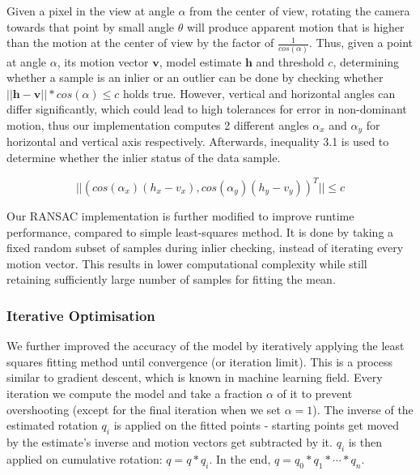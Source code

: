 \documentclass[11pt,english]{report}
\begin{document}
Given a pixel in the view at angle $\alpha$ from the center of view, rotating the camera towards that point by small angle $\theta$ will produce apparent motion that is higher than the motion at the center of view by the factor of $\frac{1}{cos(\alpha)}$. Thus, given a point at angle $\alpha$, its motion vector $\mathbf{v}$, model estimate $\mathbf{h}$ and threshold $c$, determining whether a sample is an inlier or an outlier can be done by checking whether $||\mathbf{h} - \mathbf{v}|| * cos(\alpha) \leq c$ holds true. However, vertical and horizontal angles can differ significantly, which could lead to high tolerances for error in non-dominant motion, thus our implementation computes 2 different angles $\alpha_x$ and $\alpha_y$ for horizontal and vertical axis respectively. Afterwards, inequality 3.1 is used to determine whether the inlier status of the data sample.

\begin{equation}
	||(cos(\alpha_x) (h_x - v_x), cos(\alpha_y) (h_y - v_y))^T|| \leq c
\end{equation}

Our RANSAC implementation is further modified to improve runtime performance, compared to simple least-squares method. It is done by taking a fixed random subset of samples during inlier checking, instead of iterating every motion vector. This results in lower computational complexity while still retaining sufficiently large number of samples for fitting the mean.

\subsubsection{Iterative Optimisation}

We further improved the accuracy of the model by iteratively applying the least squares fitting method until convergence (or iteration limit). This is a process similar to gradient descent, which is known in machine learning field. Every iteration we compute the model and take a fraction $\alpha$ of it to prevent overshooting (except for the final iteration when we set $\alpha = 1$). The inverse of the estimated rotation $q_i$ is applied on the fitted points - starting points get moved by the estimate's inverse and motion vectors get subtracted by it. $q_i$ is then applied on cumulative rotation: $q = q * q_i$. In the end, $q = q_0 * q_1 * \cdots * q_n$.
\end{document}
